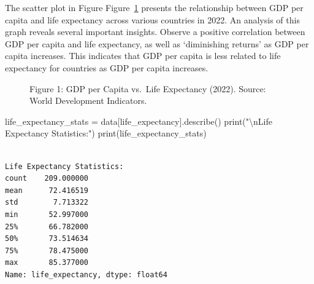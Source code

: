 \documentclass[
]{article}
\newenvironment{Shaded}{\begin{snugshade}}{\end{snugshade}}
\newcommand{\BuiltInTok}[1]{\textcolor[rgb]{0.00,0.23,0.31}{#1}}
\newcommand{\CharTok}[1]{\textcolor[rgb]{0.13,0.47,0.30}{#1}}
\newcommand{\NormalTok}[1]{\textcolor[rgb]{0.00,0.23,0.31}{#1}}
\newcommand{\OperatorTok}[1]{\textcolor[rgb]{0.37,0.37,0.37}{#1}}
\newcommand{\StringTok}[1]{\textcolor[rgb]{0.13,0.47,0.30}{#1}}
\begin{document}
The scatter plot in Figure Figure~\ref{fig-gdp-life} presents the
relationship between GDP per capita and life expectancy across various
countries in 2022. An analysis of this graph reveals several important
insights. Observe a positive correlation between GDP per capita and life
expectancy, as well as `diminishing returns' as GDP per capita
increases. This indicates that GDP per capita is less related to life
expectancy for countries as GDP per capita increases.

\begin{figure}


\caption{\label{fig-gdp-life}Figure 1: GDP per Capita vs.~Life
Expectancy (2022). Source: World Development Indicators.}

\end{figure}%

\label{life-expectancy-summary-stats}
\begin{Shaded}
\begin{Highlighting}[]
\NormalTok{life\_expectancy\_stats }\OperatorTok{=}\NormalTok{ data[}\StringTok{\textquotesingle{}life\_expectancy\textquotesingle{}}\NormalTok{].describe()}
\BuiltInTok{print}\NormalTok{(}\StringTok{"}\CharTok{\textbackslash{}n}\StringTok{Life Expectancy Statistics:"}\NormalTok{)}
\BuiltInTok{print}\NormalTok{(life\_expectancy\_stats)}
\end{Highlighting}
\end{Shaded}

\begin{verbatim}

Life Expectancy Statistics:
count    209.000000
mean      72.416519
std        7.713322
min       52.997000
25%       66.782000
50%       73.514634
75%       78.475000
max       85.377000
Name: life_expectancy, dtype: float64
\end{verbatim}
\end{document}
